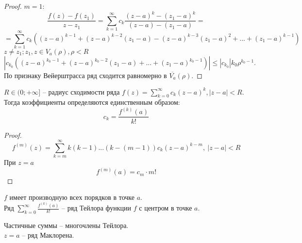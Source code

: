 \begin{proof}
    $m = 1:$\\
    $$\frac{f(z) - f(z_1)}{z - z_1} = \sum_{k = 1}^{\infty} c_k \frac{(z- a)^k - (z_1 - a)^k}{(z-a) - (z_1 - a)} =$$
    $$ = \sum_{k = 1}^{\infty} c_k \left( (z-a)^{k - 1} + (z -a)^{k - 2} (z_1 - a) - (z-a)^{k - 3}(z_1 - a)^2 + ... + (z_1 - a)^{k - 1}\right)$$  
	$z \neq z_1; z_1, z \in V_a(\rho), \rho < R$\\
	$$|c_{k_0} \left((z-a)^{k_0 - 1} + (z-a)^{k_0-2}(z_1 - a) + ... + (z_1 - a)^{k_0 - 1}\right) | \leqslant |c_{k_0}| k_0 \rho^{k_0 - 1}.$$
	По признаку Вейерштрасса ряд сходится равномерно в $\overline{V_a}(\rho)$. 
\end{proof}

\begin{Thm}
	$R \in (0; +\infty]$ -- радиус сходимости ряда $f(z) = \displaystyle\sum_{k = 0}^{\infty} c_k(z- a)^k, |z - a| < R$.\\
	Тогда коэффициенты определяются единственным образом:
	$$c_k = \frac{f^{(k)}(a)}{k!}$$
\end{Thm}

\begin{proof}
	$$f^{(m)}(z) = \sum_{k = m}^{\infty} k(k-1)...(k- (m- 1)) c_k (z - a)^{k - m}, \ |z - a| < R$$
	При $z = a$
    $$f^{(m)}(a) = c_m \cdot m!$$
\end{proof}

\begin{Def}
	$f$ имеет производную всех порядков в точке $a$. \\
	Ряд $\displaystyle \sum_{k = 0}^{\infty} \frac{f^{(k)}(a)}{k!}$ -- ряд Тейлора функции $f$ с центром в точке $a$.
\end{Def}

\begin{Rem}
	Частичные суммы -- многочлены Тейлора. \\ 
	$z = a$ -- ряд Маклорена.
\end{Rem}


